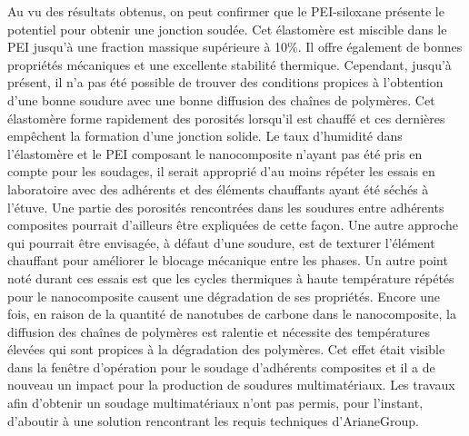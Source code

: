 Au vu des résultats obtenus, on peut confirmer que le PEI-siloxane présente le potentiel pour obtenir une jonction soudée. 
Cet élastomère est miscible dans le PEI jusqu'à une fraction massique supérieure à 10\%. 
Il offre également de bonnes propriétés mécaniques et une excellente stabilité thermique. 
Cependant, jusqu'à présent, il n'a pas été possible de trouver des conditions propices à l'obtention d'une bonne soudure avec une bonne diffusion des chaînes de polymères. 
Cet élastomère forme rapidement des porosités lorsqu'il est chauffé et ces dernières empêchent la formation d'une jonction solide. 
Le taux d'humidité dans l'élastomère et le PEI composant le nanocomposite n'ayant pas été pris en compte pour les soudages, il serait approprié d'au moins répéter les essais en laboratoire avec des adhérents et des éléments chauffants ayant été séchés à l'étuve. 
Une partie des porosités rencontrées dans les soudures entre adhérents composites pourrait d'ailleurs être expliquées de cette façon. 
Une autre approche qui pourrait être envisagée, à défaut d'une soudure, est de texturer l'élément chauffant pour améliorer le blocage mécanique entre les phases. 
Un autre point noté durant ces essais est que les cycles thermiques à haute température répétés pour le nanocomposite causent une dégradation de ses propriétés. 
Encore une fois, en raison de la quantité de nanotubes de carbone dans le nanocomposite, la diffusion des chaînes de polymères est ralentie et nécessite des températures élevées qui sont propices à la dégradation des polymères. 
Cet effet était visible dans la fenêtre d'opération pour le soudage d'adhérents composites et il a de nouveau un impact pour la production de soudures multimatériaux. 
Les travaux afin d'obtenir un soudage multimatériaux n'ont pas permis, pour l'instant, d'aboutir à une solution rencontrant les requis techniques d'ArianeGroup. 